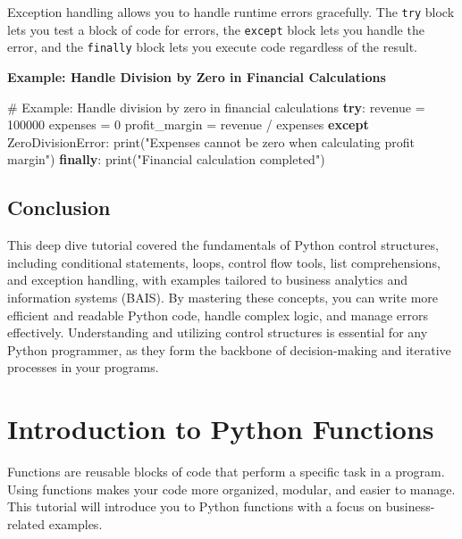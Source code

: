 \documentclass[
  letterpaper,
  DIV=11,
  numbers=noendperiod]{scrreprt}
\newenvironment{Shaded}{\begin{snugshade}}{\end{snugshade}}
\newcommand{\BuiltInTok}[1]{\textcolor[rgb]{0.00,0.23,0.31}{#1}}
\newcommand{\CommentTok}[1]{\textcolor[rgb]{0.37,0.37,0.37}{#1}}
\newcommand{\ControlFlowTok}[1]{\textcolor[rgb]{0.00,0.23,0.31}{\textbf{#1}}}
\newcommand{\DecValTok}[1]{\textcolor[rgb]{0.68,0.00,0.00}{#1}}
\newcommand{\NormalTok}[1]{\textcolor[rgb]{0.00,0.23,0.31}{#1}}
\newcommand{\OperatorTok}[1]{\textcolor[rgb]{0.37,0.37,0.37}{#1}}
\newcommand{\PreprocessorTok}[1]{\textcolor[rgb]{0.68,0.00,0.00}{#1}}
\newcommand{\StringTok}[1]{\textcolor[rgb]{0.13,0.47,0.30}{#1}}
\begin{document}
Exception handling allows you to handle runtime errors gracefully. The
\texttt{try} block lets you test a block of code for errors, the
\texttt{except} block lets you handle the error, and the
\texttt{finally} block lets you execute code regardless of the result.

\textbf{Example: Handle Division by Zero in Financial Calculations}

\begin{Shaded}
\begin{Highlighting}[]
\CommentTok{\# Example: Handle division by zero in financial calculations}
\ControlFlowTok{try}\NormalTok{:}
\NormalTok{    revenue }\OperatorTok{=} \DecValTok{100000}
\NormalTok{    expenses }\OperatorTok{=} \DecValTok{0}
\NormalTok{    profit\_margin }\OperatorTok{=}\NormalTok{ revenue }\OperatorTok{/}\NormalTok{ expenses}
\ControlFlowTok{except} \PreprocessorTok{ZeroDivisionError}\NormalTok{:}
    \BuiltInTok{print}\NormalTok{(}\StringTok{"Expenses cannot be zero when calculating profit margin"}\NormalTok{)}
\ControlFlowTok{finally}\NormalTok{:}
    \BuiltInTok{print}\NormalTok{(}\StringTok{"Financial calculation completed"}\NormalTok{)}
\end{Highlighting}
\end{Shaded}

\section{Conclusion}\label{conclusion-3}

This deep dive tutorial covered the fundamentals of Python control
structures, including conditional statements, loops, control flow tools,
list comprehensions, and exception handling, with examples tailored to
business analytics and information systems (BAIS). By mastering these
concepts, you can write more efficient and readable Python code, handle
complex logic, and manage errors effectively. Understanding and
utilizing control structures is essential for any Python programmer, as
they form the backbone of decision-making and iterative processes in
your programs.


\chapter{Introduction to Python
Functions}\label{introduction-to-python-functions}

Functions are reusable blocks of code that perform a specific task in a
program. Using functions makes your code more organized, modular, and
easier to manage. This tutorial will introduce you to Python functions
with a focus on business-related examples.
\end{document}
